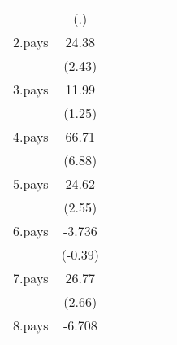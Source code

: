 {\begin{tabular}{l*{6}{c}}
                    &         (.)         &                     &                     &                     &                     &                     \\
[1em]
2.pays              &       24.38\sym{*}  &                     &                     &                     &                     &                     \\
                    &      (2.43)         &                     &                     &                     &                     &                     \\
[1em]
3.pays              &       11.99         &                     &                     &                     &                     &                     \\
                    &      (1.25)         &                     &                     &                     &                     &                     \\
[1em]
4.pays              &       66.71\sym{***}&                     &                     &                     &                     &                     \\
                    &      (6.88)         &                     &                     &                     &                     &                     \\
[1em]
5.pays              &       24.62\sym{*}  &                     &                     &                     &                     &                     \\
                    &      (2.55)         &                     &                     &                     &                     &                     \\
[1em]
6.pays              &      -3.736         &                     &                     &                     &                     &                     \\
                    &     (-0.39)         &                     &                     &                     &                     &                     \\
[1em]
7.pays              &       26.77\sym{**} &                     &                     &                     &                     &                     \\
                    &      (2.66)         &                     &                     &                     &                     &                     \\
[1em]
8.pays              &      -6.708         &                     &                     &                     &                     &                     \\

\end{tabular}}

